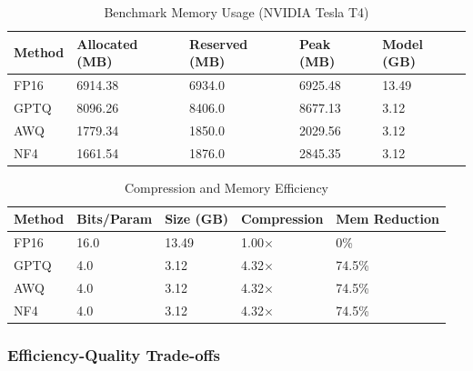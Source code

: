 \documentclass[11pt,a4paper]{article}
\begin{document}
\begin{table}[H]
\centering
\caption{Benchmark Memory Usage (NVIDIA Tesla T4)}
\begin{tabularx}{\textwidth}{@{}l C{2cm} C{2cm} C{2cm} C{2cm}@{}}
\toprule
\textbf{Method} & \textbf{Allocated (MB)} & \textbf{Reserved (MB)} & \textbf{Peak (MB)} & \textbf{Model (GB)} \\
\midrule
FP16 & 6914.38 & 6934.0 & 6925.48 & 13.49 \\
GPTQ & 8096.26 & 8406.0 & 8677.13 & 3.12 \\
AWQ & 1779.34 & 1850.0 & 2029.56 & 3.12 \\
NF4 & 1661.54 & 1876.0 & 2845.35 & 3.12 \\
\bottomrule
\end{tabularx}
\end{table}

\begin{table}[H]
\centering
\caption{Compression and Memory Efficiency}
\begin{tabularx}{\textwidth}{@{}l C{2.2cm} C{2.2cm} C{2.2cm} C{2.2cm}@{}}
\toprule
\textbf{Method} & \textbf{Bits/Param} & \textbf{Size (GB)} & \textbf{Compression} & \textbf{Mem Reduction} \\
\midrule
FP16 & 16.0 & 13.49 & 1.00$\times$ & 0\% \\
GPTQ & 4.0 & 3.12 & 4.32$\times$ & 74.5\% \\
AWQ & 4.0 & 3.12 & 4.32$\times$ & 74.5\% \\
NF4 & 4.0 & 3.12 & 4.32$\times$ & 74.5\% \\
\bottomrule
\end{tabularx}
\end{table}

\subsubsection{Efficiency-Quality Trade-offs}
\end{document}
